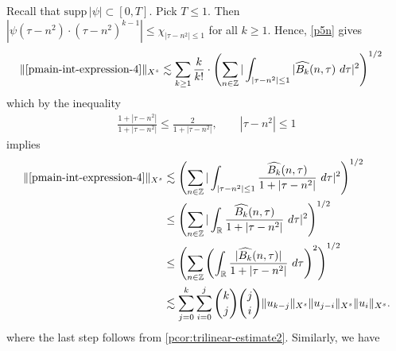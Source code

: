 %
Recall that $\text{supp} \, |\psi| \subset [0, T ]$. Pick $T \le 1$. 
Then $| \psi\left( \tau - n^{2} \right) \cdot \left( \tau - n^{2} \right)^{k 
-1} | \le \chi_{| \tau - n^{2} | \le 1}$ for all $k \ge 1$. Hence, \eqref{p5n} gives
%
\begin{equation*}
  \begin{split}
    \|\eqref{pmain-int-expression-4} \|_{X^s} 
    & \lesssim \sum_{k \ge 1} \frac{k}{k!} \cdot \left( \sum_{n \in \mathbb{Z}} | 
    \int_{| \tau - n^{2}  |\le 1} | \widehat{{B_k}}(n, \tau) \ d \tau |^2 
    \right)^{1/2}
  \end{split}
\end{equation*}
%
which by the inequality
%
\begin{equation*}
  \begin{split}
    \frac{1 + | \tau - n^{2} |}{1 + | \tau  - n^{2} |} \le 
    \frac{2}{1 + | \tau - n^{2} |}, \qquad | \tau - n^{2}  | \le 1
  \end{split}
\end{equation*}
%
implies
%
\begin{equation}
\label{pmain-int4-est-X-s-part}
  \begin{split}
    \|\eqref{pmain-int-expression-4}\|_{X^s}
    & \lesssim \left( \sum_{n \in \mathbb{Z}} | \int_{| \tau - n^{2}| \le 1 }
    \frac{\widehat{{B_k}}(n, \tau)}{1 + | \tau - n^{2} |} \ d \tau |^2 
    \right)^{1/2}
    \\
    & \le \left( \sum_{n \in \mathbb{Z}} | \int_{\mathbb{R}}
    \frac{\widehat{{B_k}}(n, \tau)}{1 + | \tau - n^{2} |} \ d \tau |^2 
    \right)^{1/2} \\
    & \le \left( \sum_{n \in \mathbb{Z}} \left( \int_{\mathbb{R}} 
    \frac{|\widehat{{B_k}}(n, \tau)|}{1 + | \tau - n^{2} |}  \ d \tau  \right)^2
    \right)^{1/2} \\
    & \lesssim 
    \sum_{j=0}^{k} \sum_{i=0}^{j} {k \choose j}{j \choose i}
    \|u_{k-j}\|_{X^s} \| u_{j-i}\|_{X^s}
    \| u_i \|_{X^s}.
  \end{split}
\end{equation}
%
where the last step follows from \cref{pcor:trilinear-estimate2}. Similarly,
we have
%
%
